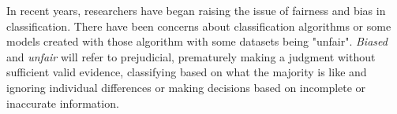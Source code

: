 \documentclass[a4paper, 12pt, titlepage]{article}
\begin{document}


In recent years, researchers have began raising the issue of fairness and bias in  classification. There have been concerns about classification algorithms or some models created with those algorithm with some datasets being "unfair". \emph{Biased} and \emph{unfair} will refer to prejudicial, prematurely making a judgment without sufficient valid evidence, classifying based on what the majority is like and ignoring individual differences or making decisions based on incomplete or inaccurate information. 
\end{document}

